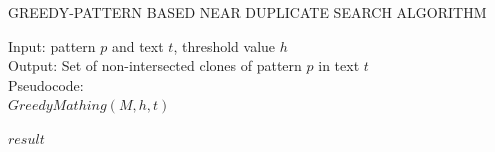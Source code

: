\begin{algorithm}[!t]
\caption{GREEDY-PATTERN BASED NEAR DUPLICATE
SEARCH ALGORITHM}
\label{alg:appximateMatchingGreedy}
Input: pattern $p$ and text $t$, threshold value $h$\\
Output: Set of non-intersected clones of pattern $p$ in text $t$\\
Pseudocode:\\
$GreedyMathing(M,h,t)$
\begin{algorithmic}[1]

\RETURN $result$
\end{algorithmic}
\end{algorithm}


